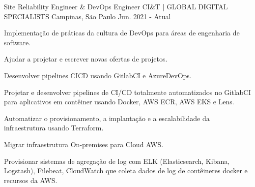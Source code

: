 

\begin{cventries}

  \cventry
    {Site Reliability Engineer \& DevOps Engineer} %
    {CI\&T | GLOBAL DIGITAL SPECIALISTS} %
    {Campinas, São Paulo} %
    {Jun. 2021 - Atual} %
    {
      \begin{cvitems} %
        \item {Implementação de práticas da cultura de DevOps para áreas de engenharia de software.}
        \item {Ajudar a projetar e escrever novas ofertas de projetos.}
        \item {Desenvolver pipelines CICD usando GitlabCI e AzureDevOps.}
        \item {Projetar e desenvolver pipelines de CI/CD totalmente automatizados no GitlabCI para aplicativos em contêiner usando Docker, AWS ECR, AWS EKS e Lens.}
        \item {Automatizar o provisionamento, a implantação e a escalabilidade da infraestrutura usando Terraform.}
        \item {Migrar infraestrutura On-premises para Cloud AWS.}
        \item {Provisionar sistemas de agregação de log com ELK (Elasticsearch, Kibana, Logstash), Filebeat, CloudWatch que coleta dados de log de contêineres docker e recursos da AWS.}
      \end{cvitems}
    }
  \break


\end{cventries}
